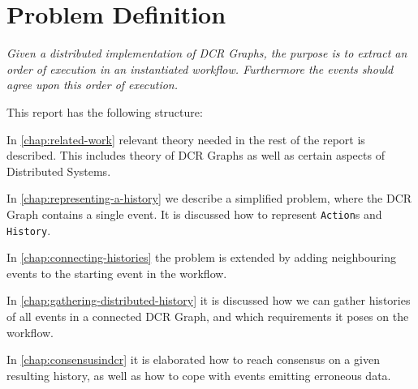 \section{Problem Definition} %
	\textit{Given a distributed implementation of DCR Graphs, the purpose is to extract an order of execution in an instantiated workflow. Furthermore the events should agree upon this order of execution.}
	
	\vspace{1cm}
	
	\newpar
	This report has the following structure:
	
	\newpar
	In \autoref{chap:related-work} relevant theory needed in the rest of the report is described. This includes theory of DCR Graphs as well as certain aspects of Distributed Systems. 
	
	\newpar
	In \autoref{chap:representing-a-history} we describe a simplified problem, where the DCR Graph contains a single event. It is discussed how to represent \texttt{Action}s and \texttt{History}. 
	
	\newpar
	In \autoref{chap:connecting-histories} the problem is extended by adding neighbouring events to the starting event in the workflow. 
	
	\newpar
	In \autoref{chap:gathering-distributed-history} it is discussed how we can gather histories of all events in a connected DCR Graph, and which requirements it poses on the workflow. 
	
	\newpar
	In \autoref{chap:consensusindcr} it is elaborated how to reach consensus on a given resulting history, as well as how to cope with events emitting erroneous data.